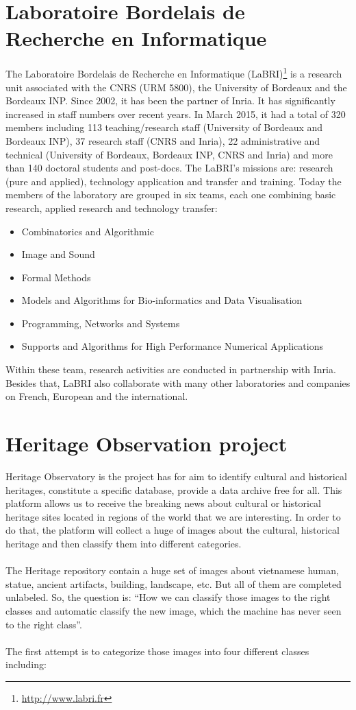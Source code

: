 \documentclass[hidelinks,12pt,a4paper]{report}
\begin{document}
\section{Laboratoire Bordelais de Recherche en Informatique}
The Laboratoire Bordelais de Recherche en Informatique (LaBRI)\footnote{\url{http://www.labri.fr}} is a research unit associated with the CNRS (URM 5800), the University of Bordeaux and the Bordeaux INP. Since 2002, it has been the partner of Inria. It has significantly increased in staff numbers over recent years.
In March 2015, it had a total of 320 members including 113 teaching/research staff (University of Bordeaux and Bordeaux INP), 37 research staff (CNRS and Inria), 22 administrative and technical (University of Bordeaux, Bordeaux INP, CNRS and Inria) and more than 140 doctoral
students and post-docs. The LaBRI’s missions are: research (pure and applied), technology application and transfer and training.
Today the members of the laboratory are grouped in six teams, each one combining basic research, applied research and technology transfer:
\begin{itemize}
	\item Combinatorics and Algorithmic
	\item Image and Sound
	\item Formal Methods
	\item Models and Algorithms for Bio-informatics and Data Visualisation
	\item Programming, Networks and Systems
	\item Supports and Algorithms for High Performance Numerical Applications
\end{itemize}
Within these team, research activities are conducted in partnership with Inria. Besides that, LaBRI also collaborate with many other laboratories and companies on French, European and the international.
\newpage
\section{Heritage Observation project}
Heritage Observatory is the project has for aim to identify cultural and historical heritages, constitute a specific database, provide a data archive free for all. This platform allows us to receive the breaking news about cultural or historical heritage sites located in regions of the world that we are interesting. In order to do that, the platform will collect a huge of images about the cultural, historical heritage and then classify them into different categories. \\\\
The Heritage repository contain a huge set of images about vietnamese human, statue, ancient artifacts, building, landscape, etc. But all of them are completed unlabeled. So, the question is: ``How we can classify those images to the right classes and automatic classify the new image, which the machine has never seen to the right class''.\\\\
The first attempt is to categorize those images into four different classes including:
\end{document}
